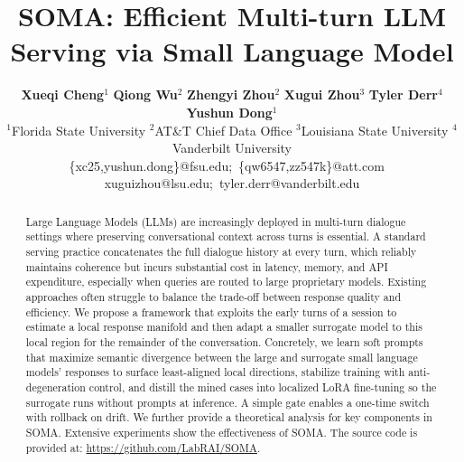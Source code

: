 \documentclass{article}
\title{SOMA: Efficient Multi-turn LLM Serving via Small Language Model}
\author{%
\begin{tabular}{c}
\small
\textbf{Xueqi Cheng}$^{1}$ \quad
\textbf{Qiong Wu}$^{2}$ \quad
\textbf{Zhengyi Zhou}$^{2}$ \quad
\textbf{Xugui Zhou}$^{3}$ \quad
\textbf{Tyler Derr}$^{4}$ \quad
\textbf{Yushun Dong}$^{1}$ \\
{\normalfont\footnotesize
$^{1}$Florida State University \quad
$^{2}$AT\&T Chief Data Office \quad
$^{3}$Louisiana State University \quad
$^{4}$Vanderbilt University} \\
{\normalfont\ttfamily\scriptsize
\{xc25,yushun.dong\}@fsu.edu;\ \{qw6547,zz547k\}@att.com} \
{\normalfont\ttfamily\scriptsize
xuguizhou@lsu.edu;\ tyler.derr@vanderbilt.edu}
\end{tabular}%
}
\theoremstyle{plain}
\theoremstyle{definition}
\theoremstyle{remark}
\theoremstyle{problem}
\begin{document}
\maketitle

\begin{abstract}

Large Language Models (LLMs) are increasingly deployed in multi-turn dialogue settings where preserving conversational context across turns is essential. A standard serving practice concatenates the full dialogue history at every turn, which reliably maintains coherence but incurs substantial cost in latency, memory, and API expenditure, especially when queries are routed to large proprietary models. Existing approaches often struggle to balance the trade-off between response quality and efficiency. We propose a framework that exploits the early turns of a session to estimate a local response manifold and then adapt a smaller surrogate model to this local region for the remainder of the conversation. Concretely, we learn soft prompts that maximize semantic divergence between the large and surrogate small language models' responses to surface least-aligned local directions, stabilize training with anti-degeneration control, and distill the mined cases into localized LoRA fine-tuning so the surrogate runs without prompts at inference. A simple gate enables a one-time switch with rollback on drift. We further provide a theoretical analysis for key components in SOMA. Extensive experiments show the effectiveness of SOMA. The source code is provided at: 
\url{https://github.com/LabRAI/SOMA}.
\end{abstract}














\appendix

\newpage


% 
\end{document}
